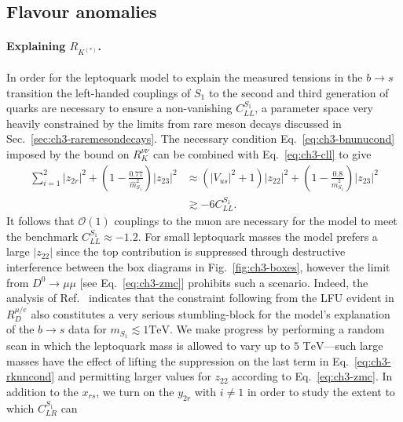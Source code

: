 \subsection{Flavour anomalies}

\paragraph{Explaining $R_{K^{(*)}}$.} In order for the leptoquark model to
explain the measured tensions in the $b \to s$ transition the left-handed
couplings of $S_{1}$ to the second and third generation of quarks are necessary
to ensure a non-vanishing $C_{LL}^{S_{1}}$, a parameter space very heavily
constrained by the limits from rare meson decays discussed in
Sec.~\ref{sec:ch3-raremesondecays}. The necessary condition Eq.~\eqref{eq:ch3-bnunucond}
imposed by the bound on $R_K^{\nu\nu}$ can be combined with Eq.~\eqref{eq:ch3-cll}
to give~\cite{Bauer:2015knc}
\begin{equation} \label{eq:ch3-rknncond}
  \begin{split}
    \sum_{i=1}^2 |z_{2r}|^2 + \left( 1 - \frac{0.77}{\hat{m}_{S_{1}}^2}
    \right) |z_{23}|^2 &\approx \left(|V_{us}|^2 + 1\right) |z_{22}|^2 +
    \left( 1 - \frac{0.8}{\hat{m}_{S_{1}}^2} \right) |z_{23}|^2\\ &\gtrsim - 6
    C_{LL}^{S_{1}}.
  \end{split}
\end{equation}
It follows that $\mathscr{O}(1)$ couplings to the muon are necessary for the
model to meet the benchmark $C_{LL}^{S_{1}} \approx -1.2$. For small leptoquark
masses the model prefers a large $|z_{22}|$ since the top contribution is
suppressed through destructive interference between the box diagrams in
Fig.~\ref{fig:ch3-boxes}, however the limit from $D^0 \to \mu \mu$ [see
Eq.~\eqref{eq:ch3-zmc}] prohibits such a scenario. Indeed, the analysis of
Ref.~\cite{Becirevic:2016oho} indicates that the constraint following from the
LFU evident in $R_D^{\mu/e}$ also constitutes a very serious stumbling-block for
the model's explanation of the $b \to s$ data for $m_{S_{1}} \lesssim 1 \text{
  TeV}$. We make progress by performing a random scan in which the leptoquark
mass is allowed to vary up to $5 \text{ TeV}$---such large masses have the
effect of lifting the suppression on the last term in
Eq.~\eqref{eq:ch3-rknncond} and permitting larger values for $z_{22}$ according
to Eq.~\eqref{eq:ch3-zmc}. In addition to the $x_{rs}$, we turn on the $y_{2r}$
with $i \neq 1$ in order to study the extent to which $C_{LR}^{S_{1}}$ can
